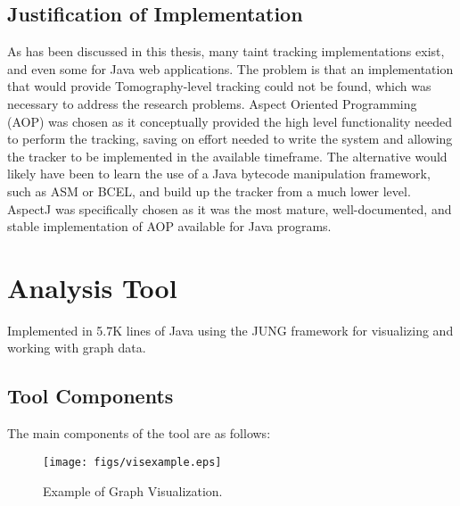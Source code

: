 \documentclass[msc,oneside]{ubcthesis}
\begin{document}
\subsection{Justification of Implementation}
As has been discussed in this thesis, many taint tracking implementations exist, and even some for Java web applications. The problem is that an implementation that would provide Tomography-level tracking could not be found, which was necessary to address the research problems. Aspect Oriented Programming (AOP) was chosen as it conceptually provided the high level functionality needed to perform the tracking, saving on effort needed to write the system and allowing the tracker to be implemented in the available timeframe. The alternative would likely have been to learn the use of a Java bytecode manipulation framework, such as ASM or BCEL, and build up the tracker from a much lower level. AspectJ was specifically chosen as it was the most mature, well-documented, and stable implementation of AOP available for Java programs.






\section{Analysis Tool}
Implemented in 5.7K lines of Java using the JUNG framework for visualizing and working with graph data.

\subsection{Tool Components}
The main components of the tool are as follows:

\begin{figure}[ht]
  \begin{center}
    \texttt{[image: figs/visexample.eps]}
    \caption[Example of Graph Visualization.]{\label{fig:visexample} Example of Graph Visualization.}
  \end{center}
\end{figure}
\end{document}
